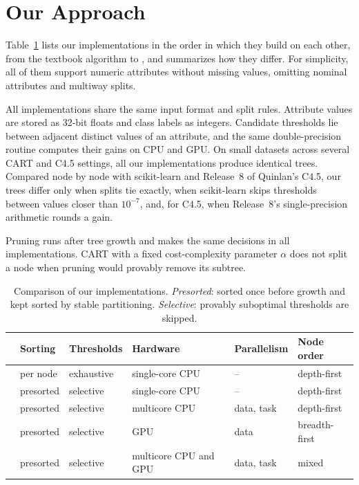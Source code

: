 \section{Our Approach}
\label{sec:impl}

Table~\ref{tab:impl} lists our implementations in the order in which they build on each other, from the textbook algorithm to \ImplHybrid{}, and summarizes how they differ. For simplicity, all of them support numeric attributes without missing values, omitting nominal attributes and multiway splits.

All implementations share the same input format and split rules. Attribute values are stored as 32-bit floats and class labels as integers. Candidate thresholds lie between adjacent distinct values of an attribute, and the same double-precision routine computes their gains on CPU and GPU. On small datasets across several CART and C4.5 settings, all our implementations produce identical trees. Compared node by node with scikit-learn and Release~8 of Quinlan's C4.5, our trees differ only when splits tie exactly, when scikit-learn skips thresholds between values closer than $10^{-7}$, and, for C4.5, when Release~8's single-precision arithmetic rounds a gain.

Pruning runs after tree growth and makes the same decisions in all implementations. CART with a fixed cost-complexity parameter $\alpha$ does not split a node when pruning would provably remove its subtree.

\begin{table}
\caption{Comparison of our implementations. \emph{Presorted}: sorted once before growth and kept sorted by stable partitioning. \emph{Selective}: provably suboptimal thresholds are skipped.}
\label{tab:impl}
\centering
\begin{tabular}{@{}llllll@{}}
\toprule
 & Sorting & Thresholds & Hardware & Parallelism & Node order \\
\midrule
\ImplSerialBase{} & per node  & exhaustive & single-core CPU & --         & depth-first \\
\ImplSerialOpt{}  & presorted & selective  & single-core CPU & --         & depth-first \\
\ImplParallel{}   & presorted & selective  & multicore CPU   & data, task & depth-first \\
\ImplGpu{}        & presorted & selective  & GPU             & data       & breadth-first \\
\ImplHybrid{}     & presorted & selective  & multicore CPU and GPU        & data, task & mixed \\
\bottomrule
\end{tabular}
\end{table}

